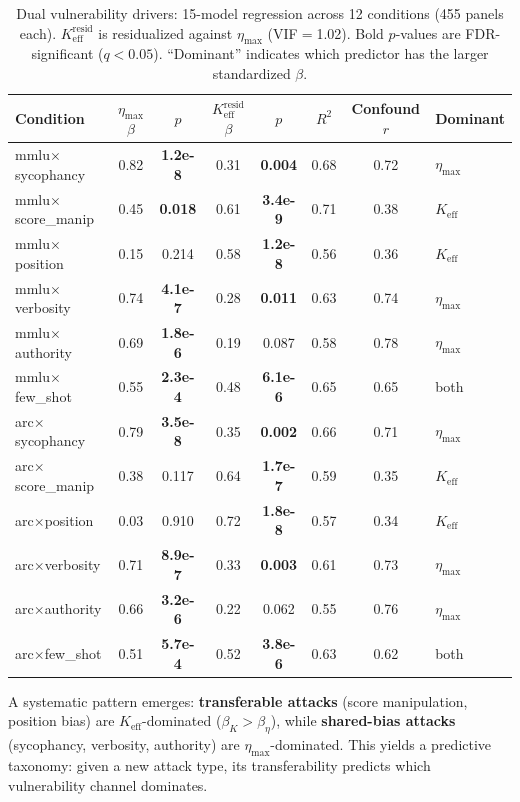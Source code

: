 \documentclass[11pt,a4paper]{article}
\newcommand{\keff}{K_{\text{eff}}}
\newcommand{\etamax}{\eta_{\text{max}}}
\newcommand{\keffresid}{K_{\text{eff}}^{\text{resid}}}
\begin{document}
\begin{table}[t]
\centering
\small
\caption{Dual vulnerability drivers: 15-model regression across 12 conditions (455 panels each). $\keffresid$ is residualized against $\etamax$ (VIF$=$1.02). Bold $p$-values are FDR-significant ($q < 0.05$). ``Dominant'' indicates which predictor has the larger standardized $\beta$.}
\label{tab:core}
\begin{tabular}{lccccccl}
\toprule
Condition & $\etamax$ $\beta$ & $p$ & $\keffresid$ $\beta$ & $p$ & $R^2$ & Confound $r$ & Dominant \\
\midrule
mmlu$\times$sycophancy & 0.82 & \textbf{1.2e-8} & 0.31 & \textbf{0.004} & 0.68 & 0.72 & $\etamax$ \\
mmlu$\times$score\_manip & 0.45 & \textbf{0.018} & 0.61 & \textbf{3.4e-9} & 0.71 & 0.38 & $\keff$ \\
mmlu$\times$position & 0.15 & 0.214 & 0.58 & \textbf{1.2e-8} & 0.56 & 0.36 & $\keff$ \\
mmlu$\times$verbosity & 0.74 & \textbf{4.1e-7} & 0.28 & \textbf{0.011} & 0.63 & 0.74 & $\etamax$ \\
mmlu$\times$authority & 0.69 & \textbf{1.8e-6} & 0.19 & 0.087 & 0.58 & 0.78 & $\etamax$ \\
mmlu$\times$few\_shot & 0.55 & \textbf{2.3e-4} & 0.48 & \textbf{6.1e-6} & 0.65 & 0.65 & both \\
\midrule
arc$\times$sycophancy & 0.79 & \textbf{3.5e-8} & 0.35 & \textbf{0.002} & 0.66 & 0.71 & $\etamax$ \\
arc$\times$score\_manip & 0.38 & 0.117 & 0.64 & \textbf{1.7e-7} & 0.59 & 0.35 & $\keff$ \\
arc$\times$position & 0.03 & 0.910 & 0.72 & \textbf{1.8e-8} & 0.57 & 0.34 & $\keff$ \\
arc$\times$verbosity & 0.71 & \textbf{8.9e-7} & 0.33 & \textbf{0.003} & 0.61 & 0.73 & $\etamax$ \\
arc$\times$authority & 0.66 & \textbf{3.2e-6} & 0.22 & 0.062 & 0.55 & 0.76 & $\etamax$ \\
arc$\times$few\_shot & 0.51 & \textbf{5.7e-4} & 0.52 & \textbf{3.8e-6} & 0.63 & 0.62 & both \\
\bottomrule
\end{tabular}
\end{table}

A systematic pattern emerges: \textbf{transferable attacks} (score manipulation, position bias) are $\keff$-dominated ($\beta_K > \beta_\eta$), while \textbf{shared-bias attacks} (sycophancy, verbosity, authority) are $\etamax$-dominated. This yields a predictive taxonomy: given a new attack type, its transferability predicts which vulnerability channel dominates.
\end{document}
